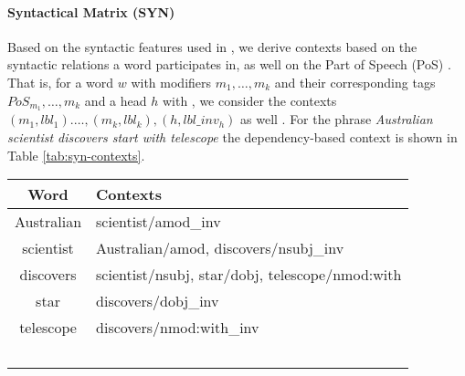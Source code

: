 \documentclass[11pt]{article}
\begin{document}
\paragraph{Syntactical Matrix (SYN)}
Based on the syntactic features used in   \cite{LevyG14,Panchenko2017}, we derive contexts based on the syntactic relations a word participates in, as well on the Part of Speech (PoS)   .  That is, for a word $w$ with modifiers $m_1, \dots, m_k$ and their corresponding  tags $PoS_{m_1}, \dots, m_k$  and a head $h$ with , we consider the contexts $(m_1, lbl_1). \dots, (m_k, lbl_k), (h, lbl\_inv_h)$ as well . For the phrase \textit{Australian scientist discovers start with telescope} the dependency-based context is shown in Table \ref{tab:syn-contexts}.
\begin{table*}
\begin{tabular}{cl}
\hline 
 Word & Contexts \\ 
\hline 
Australian & scientist/amod\_inv \\ 
scientist  &  Australian/amod, discovers/nsubj\_inv\\ 
discovers & scientist/nsubj, star/dobj, telescope/nmod:with \\ 
star & discovers/dobj\_inv \\ 
telescope  &  discovers/nmod:with\_inv \\ 
\hline \
\end{tabular} 
\label{tab:syn-contexts}
\caption{Syntactic contexts corresponding to the phrase \textit{Australian scientist discovers start with telescope}.}
\end{table*}
\vspace{.6cm}



\end{document}
